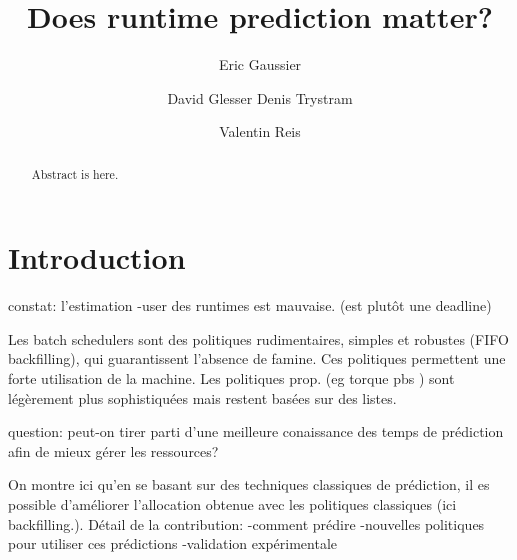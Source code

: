 \documentclass{llncs}
\begin{document}
\mainmatter


\title{Does runtime prediction matter?}

\author{Eric Gaussier \and David Glesser
Denis Trystram \and Valentin Reis}


\maketitle              %

\begin{abstract}

Abstract is here.

\end{abstract}






\section{Introduction}
\label{sec:introduction}
constat: l'estimation -user des runtimes est mauvaise. (est plutôt une deadline)

Les batch schedulers sont des politiques rudimentaires, simples et robustes (FIFO backfilling), qui guarantissent l'absence de famine. Ces politiques permettent une forte utilisation de la machine.
Les politiques prop. (eg torque pbs ) sont légèrement plus sophistiquées mais restent basées sur des listes.\

question: peut-on tirer parti d'une meilleure conaissance des temps de prédiction afin de mieux gérer les ressources?

On montre ici qu'en se basant sur des techniques classiques de prédiction, il es possible d'améliorer  l'allocation obtenue avec les politiques classiques (ici backfilling.).
Détail de la contribution:
-comment prédire
-nouvelles politiques pour utiliser ces prédictions
-validation expérimentale
\end{document}
